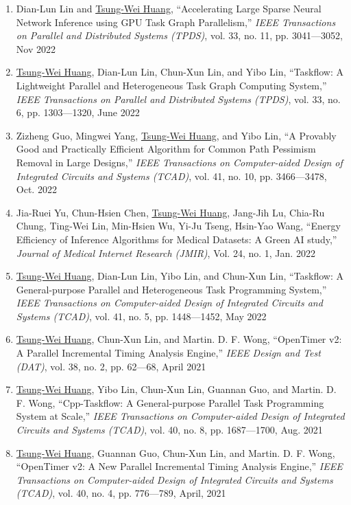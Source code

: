 \documentclass[A4,11pt]{article}
\begin{document}
 \begin{enumerate}
 \itemsep-3pt
  \item Dian-Lun Lin and \underline{Tsung-Wei Huang}, ``Accelerating Large Sparse Neural Network Inference using GPU Task Graph Parallelism,'' \textit{IEEE Transactions on Parallel and Distributed Systems (TPDS)}, vol. 33, no. 11, pp. 3041—3052, Nov 2022
  \item \underline{Tsung-Wei Huang}, Dian-Lun Lin, Chun-Xun Lin, and Yibo Lin, ``Taskflow: A Lightweight Parallel and Heterogeneous Task Graph Computing System,'' \textit{IEEE Transactions on Parallel and Distributed Systems (TPDS)}, vol. 33, no. 6, pp. 1303—1320, June 2022
  \item Zizheng Guo, Mingwei Yang, \underline{Tsung-Wei Huang}, and Yibo Lin, ``A Provably Good and Practically Efficient Algorithm for Common Path Pessimism Removal in Large Designs,'' \textit{IEEE Transactions on Computer-aided Design of Integrated Circuits and Systems (TCAD)}, vol. 41, no. 10, pp. 3466—3478, Oct. 2022
  \item Jia-Ruei Yu, Chun-Hsien Chen, \underline{Tsung-Wei Huang}, Jang-Jih Lu, Chia-Ru Chung, Ting-Wei Lin, Min-Hsien Wu, Yi-Ju Tseng, Hsin-Yao Wang, ``Energy Efficiency of Inference Algorithms for Medical Datasets: A Green AI study,'' \textit{Journal of Medical Internet Research (JMIR)}, Vol. 24, no. 1, Jan. 2022
  \item \underline{Tsung-Wei Huang}, Dian-Lun Lin, Yibo Lin, and Chun-Xun Lin, ``Taskflow: A General-purpose Parallel and Heterogeneous Task Programming System,'' \textit{IEEE Transactions on Computer-aided Design of Integrated Circuits and Systems (TCAD)}, vol. 41, no. 5, pp. 1448—1452, May 2022
  \item \underline{Tsung-Wei Huang}, Chun-Xun Lin, and Martin. D. F. Wong, ``OpenTimer v2: A Parallel Incremental Timing Analysis Engine,'' \textit{IEEE Design and Test (DAT)}, vol. 38, no. 2, pp. 62—68, April 2021
  \item \underline{Tsung-Wei Huang}, Yibo Lin, Chun-Xun Lin, Guannan Guo, and Martin. D. F. Wong, ``Cpp-Taskflow: A General-purpose Parallel Task Programming System at Scale,'' \textit{IEEE Transactions on Computer-aided Design of Integrated Circuits and Systems (TCAD)}, vol. 40, no. 8, pp. 1687—1700, Aug. 2021
  \item \underline{Tsung-Wei Huang}, Guannan Guo, Chun-Xun Lin, and Martin. D. F. Wong, ``OpenTimer v2: A New Parallel Incremental Timing Analysis Engine,'' \textit{IEEE Transactions on Computer-aided Design of Integrated Circuits and Systems (TCAD)}, vol. 40, no. 4, pp. 776—789, April, 2021

\end{enumerate}
\end{document}
